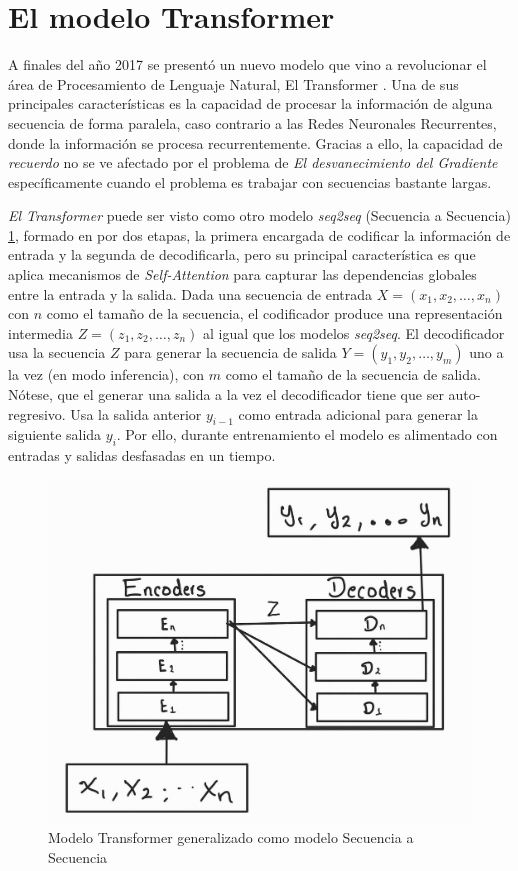 \section{El modelo Transformer}

A finales del año 2017 se presentó un nuevo modelo que vino a revolucionar el área de Procesamiento
de Lenguaje Natural, El Transformer \cite{Vaswani}. Una de sus principales características es la
capacidad de procesar la información de alguna secuencia de forma paralela, caso contrario a las
Redes Neuronales Recurrentes, donde la información se procesa recurrentemente. Gracias a ello,
la capacidad de \textit{recuerdo} no se ve afectado por el problema de \textit{El desvanecimiento
del Gradiente} específicamente cuando el problema es trabajar con secuencias  bastante largas.

\textit{El Transformer} puede ser visto como otro modelo \textit{seq2seq} (Secuencia a Secuencia)
\ref{fig:trans_seq2sqe}, formado en por dos etapas, la primera encargada de codificar la información de entrada
y la segunda de decodificarla, pero su principal característica es que aplica mecanismos de
\textit{Self-Attention} para capturar las dependencias globales entre la entrada y la salida. Dada
una secuencia de entrada $X = (x_1, x_2, \dots, x_n )$ con $n$ como el tamaño de la secuencia,
el codificador produce una representación intermedia
$Z = (z_1, z_2, \dots, z_n)$ al igual que los modelos \textit{seq2seq}. El decodificador usa la
secuencia $Z$ para generar la secuencia de salida
$Y = (y_1, y_2, \dots, y_m)$ uno a la vez (en modo inferencia), con $m$ como el tamaño de la
secuencia de salida. Nótese, que el generar una salida a la vez el decodificador tiene que ser auto-regresivo.
Usa la salida anterior $y_{i-1}$ como entrada adicional para generar la siguiente salida $y_i$. Por
ello, durante entrenamiento el modelo es alimentado con entradas y salidas desfasadas en un tiempo.

\begin{figure}[ht!]
    \centering
    \includegraphics[width=0.4 \textwidth]{Chapters/2. Transformer/Figures/transformer/t_seq2seq.jpg}
    \caption{Modelo Transformer generalizado como modelo Secuencia a Secuencia}
    \label{fig:trans_seq2sqe}
\end{figure}


